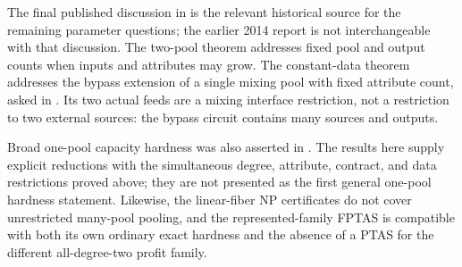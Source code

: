 The final published discussion in
\citet[Section~6, p.~214]{haugland2016-the-computational-complexity-of-the}
is the relevant historical source for the remaining parameter questions;
the earlier 2014 report is not interchangeable with that discussion.
The two-pool theorem addresses fixed pool and output counts when inputs
and attributes may grow. The constant-data theorem addresses the bypass
extension of a single mixing pool with fixed attribute count, asked in
\citet[Section~4.5, p.~607]{s3:haugland-hendrix2016}. Its two actual
feeds are a mixing interface restriction, not a restriction to two
external sources: the bypass circuit contains many sources and outputs.

Broad one-pool capacity hardness was also asserted in
\citet[Remark~4.6]{s3:baltean2018}. The results here supply explicit
reductions with the simultaneous degree, attribute, contract, and data
restrictions proved above; they are not presented as the first general
one-pool hardness statement. Likewise, the linear-fiber NP certificates
do not cover unrestricted many-pool pooling, and the represented-family
FPTAS is compatible with both its own ordinary exact hardness and the
absence of a PTAS for the different all-degree-two profit family.
